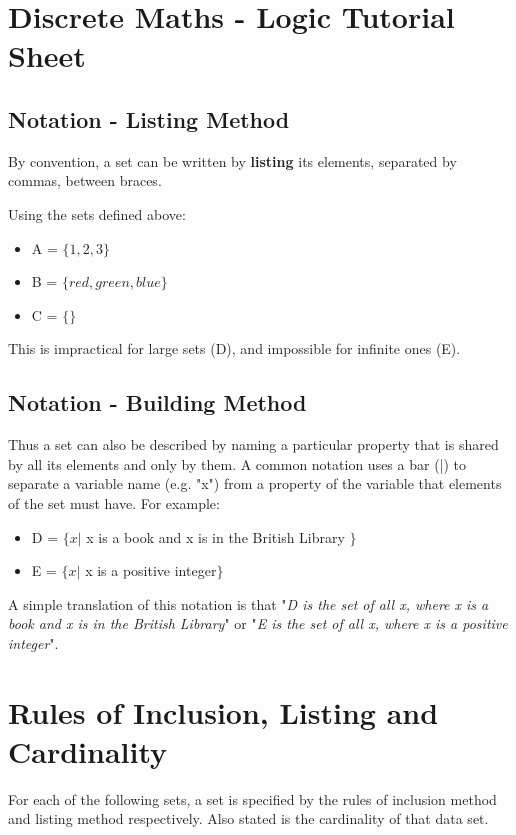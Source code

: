 \documentclass[12pt]{article}
\begin{document}
\section{Discrete Maths - Logic Tutorial Sheet}


\subsection{Notation - Listing Method}

By convention, a set can be written by \textbf{listing} its elements, separated by commas, between {braces}. 

Using the sets defined above:
\begin{itemize}
\item A = $\{1, 2, 3\}$
\item B = $\{red, green, blue\}$
\item C = $\{\}$
\end{itemize}
This is impractical for large sets (D), and impossible for infinite ones (E). 
\subsection{Notation - Building Method}
Thus a set can also be described by naming a particular property that is shared by all its elements and only by them. A common notation uses a bar (|) to separate a variable name (e.g. "x") from a property of the variable that elements of the set must have. For example:
\begin{itemize}
\item D = $\{x |$ x is a book and x is in the British Library $\}$
\item E = $\{x |$ x is a positive integer$\}$
\end{itemize}
A simple translation of this notation is that "\textit{D is the set of all x, where x is a book and x is in the British Library}" or "\textit{E is the set of all x, where x is a positive integer}".




\section*{Rules of Inclusion, Listing and Cardinality}
For each of the following sets, a set is specified by the rules of inclusion method and listing method respectively. Also stated is the cardinality of that data set.
\end{document}

